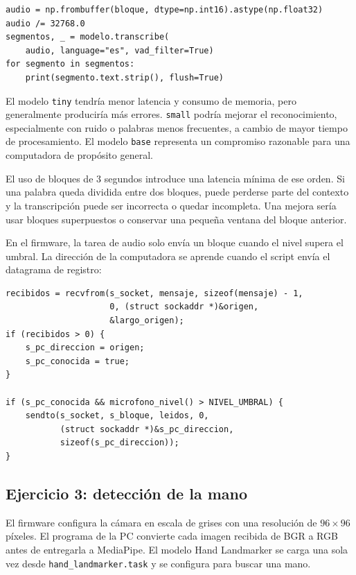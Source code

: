 \documentclass[12pt, letterpaper]{article}
\begin{document}
\begin{lstlisting}[style=pythonstyle, caption={Conversión y transcripción del audio}, label={lst:whisper}]
audio = np.frombuffer(bloque, dtype=np.int16).astype(np.float32)
audio /= 32768.0
segmentos, _ = modelo.transcribe(
	audio, language="es", vad_filter=True)
for segmento in segmentos:
	print(segmento.text.strip(), flush=True)
\end{lstlisting}

El modelo \texttt{tiny} tendría menor latencia y consumo de memoria, pero
generalmente produciría más errores. \texttt{small} podría mejorar el
reconocimiento, especialmente con ruido o palabras menos frecuentes, a cambio
de mayor tiempo de procesamiento. El modelo \texttt{base} representa un
compromiso razonable para una computadora de propósito general.

El uso de bloques de 3 segundos introduce una latencia mínima de ese orden. Si
una palabra queda dividida entre dos bloques, puede perderse parte del contexto
y la transcripción puede ser incorrecta o quedar incompleta. Una mejora sería
usar bloques superpuestos o conservar una pequeña ventana del bloque anterior.

En el firmware, la tarea de audio solo envía un bloque cuando el nivel supera
el umbral. La dirección de la computadora se aprende cuando el script envía el
datagrama de registro:

\begin{lstlisting}[style=cstyle, caption={Registro de la PC y envío de audio por UDP}, label={lst:audio-udp}]
recibidos = recvfrom(s_socket, mensaje, sizeof(mensaje) - 1,
					 0, (struct sockaddr *)&origen,
					 &largo_origen);
if (recibidos > 0) {
	s_pc_direccion = origen;
	s_pc_conocida = true;
}

if (s_pc_conocida && microfono_nivel() > NIVEL_UMBRAL) {
	sendto(s_socket, s_bloque, leidos, 0,
		   (struct sockaddr *)&s_pc_direccion,
		   sizeof(s_pc_direccion));
}
\end{lstlisting}

\subsection*{\fontsize{12}{17}\selectfont Ejercicio 3: detección de la mano}

El firmware configura la cámara en escala de grises con una resolución de
$96\times96$ píxeles. El programa de la PC convierte cada imagen recibida de
BGR a RGB antes de entregarla a MediaPipe. El modelo Hand Landmarker se carga
una sola vez desde \texttt{hand\_landmarker.task} y se configura para buscar
una mano.
\end{document}
